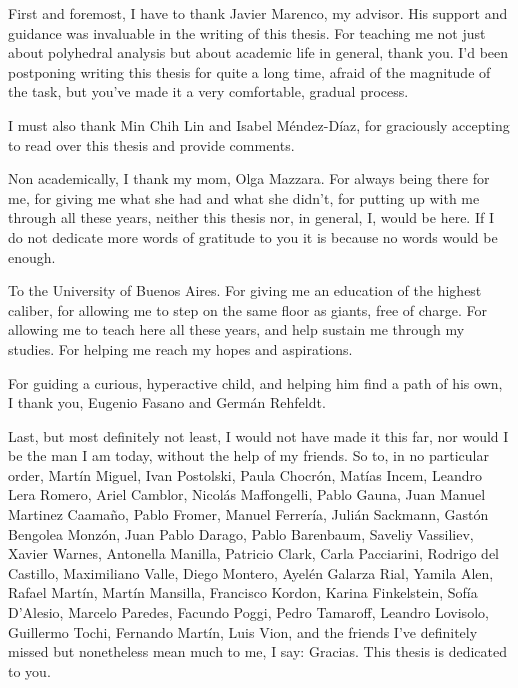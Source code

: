 First and foremost, I have to thank Javier Marenco, my advisor. His support and guidance was invaluable in the writing of this thesis. For teaching me not just about polyhedral analysis but about academic life in general, thank you. I'd been postponing writing this thesis for quite a long time, afraid of the magnitude of the task, but you've made it a very comfortable, gradual process.

I must also thank Min Chih Lin and Isabel Méndez-Díaz, for graciously accepting to read over this thesis and provide comments.

Non academically, I thank my mom, Olga Mazzara. For always being there for me, for giving me what she had and what she didn't, for putting up with me through all these years, neither this thesis nor, in general, I, would be here. If I do not dedicate more words of gratitude to you it is because no words would be enough.

To the University of Buenos Aires. For giving me an education of the highest caliber, for allowing me to step on the same floor as giants, free of charge. For allowing me to teach here all these years, and help sustain me through my studies. For helping me reach my hopes and aspirations.

For guiding a curious, hyperactive child, and helping him find a path of his own, I thank you, Eugenio Fasano and Germán Rehfeldt.

Last, but most definitely not least, I would not have made it this far, nor would I be the man I am today, without the help of my friends. So to, in no particular order, Martín Miguel, Ivan Postolski, Paula Chocrón, Matías Incem, Leandro Lera Romero, Ariel Camblor, Nicolás Maffongelli, Pablo Gauna, Juan Manuel Martinez Caamaño, Pablo Fromer, Manuel Ferrería, Julián Sackmann, Gastón Bengolea Monzón, Juan Pablo Darago, Pablo Barenbaum, Saveliy Vassiliev, Xavier Warnes, Antonella Manilla, Patricio Clark, Carla Pacciarini, Rodrigo del Castillo, Maximiliano Valle, Diego Montero, Ayelén Galarza Rial, Yamila Alen, Rafael Martín, Martín Mansilla, Francisco Kordon, Karina Finkelstein, Sofía D'Alesio, Marcelo Paredes, Facundo Poggi, Pedro Tamaroff, Leandro Lovisolo, Guillermo Tochi, Fernando Martín, Luis Vion, and the friends I've definitely missed but nonetheless mean much to me, I say: Gracias. This thesis is dedicated to you.
